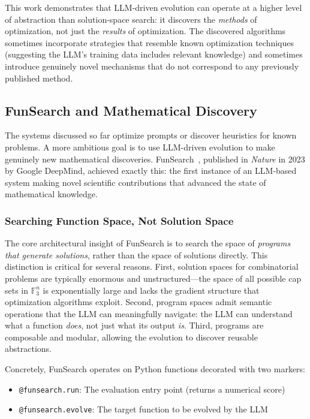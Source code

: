 This work demonstrates that LLM-driven evolution can operate at a higher level of abstraction than solution-space search: it discovers the \emph{methods} of optimization, not just the \emph{results} of optimization. The discovered algorithms sometimes incorporate strategies that resemble known optimization techniques (suggesting the LLM's training data includes relevant knowledge) and sometimes introduce genuinely novel mechanisms that do not correspond to any previously published method.

\subsection{FunSearch and Mathematical Discovery}
\label{sec:funsearch}

The systems discussed so far optimize prompts or discover heuristics for known problems. A more ambitious goal is to use LLM-driven evolution to make genuinely new mathematical discoveries. FunSearch~\citep{romera2024funsearch}, published in \emph{Nature} in 2023 by Google DeepMind, achieved exactly this: the first instance of an LLM-based system making novel scientific contributions that advanced the state of mathematical knowledge.

\subsubsection{Searching Function Space, Not Solution Space}

The core architectural insight of FunSearch is to search the space of \emph{programs that generate solutions}, rather than the space of solutions directly. This distinction is critical for several reasons. First, solution spaces for combinatorial problems are typically enormous and unstructured---the space of all possible cap sets in $\mathbb{F}_3^n$ is exponentially large and lacks the gradient structure that optimization algorithms exploit. Second, program spaces admit semantic operations that the LLM can meaningfully navigate: the LLM can understand what a function \emph{does}, not just what its output \emph{is}. Third, programs are composable and modular, allowing the evolution to discover reusable abstractions.

Concretely, FunSearch operates on Python functions decorated with two markers:
\begin{itemize}
\item \texttt{@funsearch.run}: The evaluation entry point (returns a numerical score)
\item \texttt{@funsearch.evolve}: The target function to be evolved by the LLM
\end{itemize}

